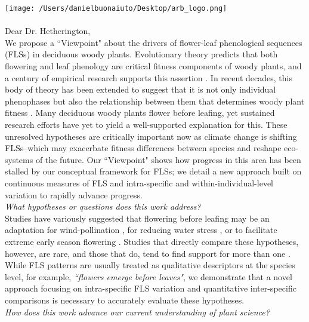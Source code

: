 \documentclass[10.5pt,a4paper]{article}
\begin{document}

\def\labelitemi{--}
\parindent=24pt
\texttt{[image: /Users/danielbuonaiuto/Desktop/arb\_logo.png]}
\\\\
{Dear Dr. Hetherington,}\\

\noindent We propose a ``Viewpoint" about the drivers of flower-leaf phenological sequences (FLSs) in deciduous woody plants. Evolutionary theory predicts that both flowering and leaf phenology are critical fitness components of woody plants, and a century of empirical research supports this assertion \citep{Munguia-Rosas2011,Forrest2010}. In recent decades, this body of theory has been extended to suggest that it is not only individual phenophases but also the relationship between them that determines woody plant fitness \citep{Menzel1999,Ettinger2018}. Many deciduous woody plants flower before leafing, yet sustained research efforts have yet to yield a well-supported explanation for this. These unresolved hypotheses are critically important now as climate change is shifting FLSs--which may exacerbate fitness differences between species and reshape eco-systems of the future. Our ``Viewpoint" shows how progress in this area has been stalled by our conceptual framework for FLSs; we detail a new approach built on continuous measures of FLS and intra-specific and within-individual-level variation to rapidly advance progress.\\

\noindent \emph{What hypotheses or questions does this work address?}\\

\noindent Studies have variously suggested that flowering before leafing may be an adaptation for wind-pollination \citep{Rathcke_1985}, for reducing water stress \citep{Reich1984}, or to facilitate extreme early season flowering \citep{Primack1987}. Studies that directly compare these hypotheses, however, are rare, and those that do, tend to find support for more than one \citep{Gougherty2018,Bolmgren2003}. While FLS patterns are usually treated as qualitative descriptors at the species level, for example, \textit{``flowers emerge before leaves"}, we demonstrate that a novel approach focusing on intra-specific FLS variation and quantitative inter-specific comparisons is necessary to accurately evaluate these hypotheses. \\

\noindent \emph{How does this work advance our current understanding of plant science?}\\
\end{document}
